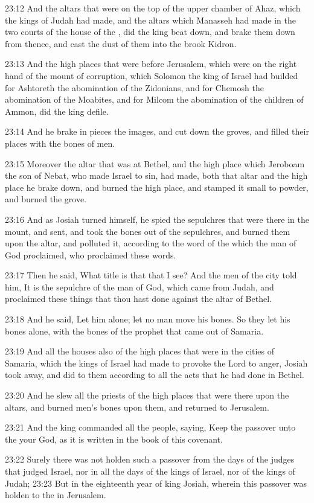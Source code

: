 23:12 And the altars that were on the top of the upper chamber of
Ahaz, which the kings of Judah had made, and the altars which Manasseh
had made in the two courts of the house of the \LORD, did the king beat
down, and brake them down from thence, and cast the dust of them into
the brook Kidron.

23:13 And the high places that were before Jerusalem, which were on
the right hand of the mount of corruption, which Solomon the king of
Israel had builded for Ashtoreth the abomination of the Zidonians, and
for Chemosh the abomination of the Moabites, and for Milcom the
abomination of the children of Ammon, did the king defile.

23:14 And he brake in pieces the images, and cut down the groves, and
filled their places with the bones of men.

23:15 Moreover the altar that was at Bethel, and the high place which
Jeroboam the son of Nebat, who made Israel to sin, had made, both that
altar and the high place he brake down, and burned the high place, and
stamped it small to powder, and burned the grove.

23:16 And as Josiah turned himself, he spied the sepulchres that were
there in the mount, and sent, and took the bones out of the
sepulchres, and burned them upon the altar, and polluted it, according
to the word of the \LORD which the man of God proclaimed, who
proclaimed these words.

23:17 Then he said, What title is that that I see? And the men of the
city told him, It is the sepulchre of the man of God, which came from
Judah, and proclaimed these things that thou hast done against the
altar of Bethel.

23:18 And he said, Let him alone; let no man move his bones. So they
let his bones alone, with the bones of the prophet that came out of
Samaria.

23:19 And all the houses also of the high places that were in the
cities of Samaria, which the kings of Israel had made to provoke the
Lord to anger, Josiah took away, and did to them according to all the
acts that he had done in Bethel.

23:20 And he slew all the priests of the high places that were there
upon the altars, and burned men's bones upon them, and returned to
Jerusalem.

23:21 And the king commanded all the people, saying, Keep the passover
unto the \LORD your God, as it is written in the book of this covenant.

23:22 Surely there was not holden such a passover from the days of the
judges that judged Israel, nor in all the days of the kings of Israel,
nor of the kings of Judah; 23:23 But in the eighteenth year of king
Josiah, wherein this passover was holden to the \LORD in Jerusalem.

